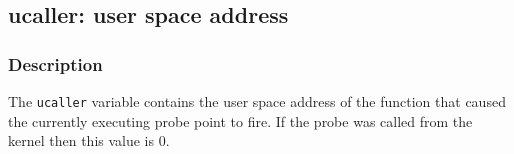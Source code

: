 \clearpage
{}
{}
\label{vars:ucaller}
\subsection*{ucaller: user space address}

\subsubsection*{Description}

The \verb|ucaller| variable contains the user space address of the
function that caused the currently executing probe point to fire.  If
the probe was called from the kernel then this value is 0.

